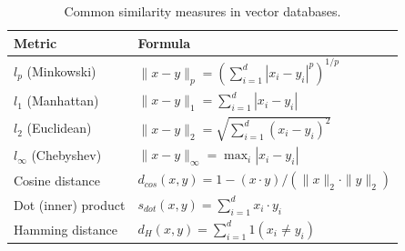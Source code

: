\begin{table}[h]
    \centering
    \renewcommand{\arraystretch}{2.3}
    \caption{Common similarity measures in vector databases.}
    \label{tab:distance-metrics}
    \begin{tabular}{|m{5cm}|m{8cm}|}
        \hline
        \textbf{Metric} & \textbf{Formula} \\ \hline
        $l_p$ (Minkowski) 
            & $\|x-y\|_p = \left(\sum_{i=1}^d |x_i-y_i|^p\right)^{1/p}$ \\ \hline
        $l_1$ (Manhattan) 
            & $\|x-y\|_1 = \sum_{i=1}^d |x_i-y_i|$ \\ \hline
        $l_2$ (Euclidean) 
            & $\|x-y\|_2 = \sqrt{\sum_{i=1}^d (x_i-y_i)^2}$ \\ \hline
        $l_\infty$ (Chebyshev) 
            & $\|x-y\|_\infty = \max_i |x_i-y_i|$ \\ \hline
        Cosine distance 
            & $d_{cos}(x,y) = 1 - (x \cdot y) / (\|x\|_2 \cdot \|y\|_2)
$ \\ \hline
        Dot (inner) product 
            & $s_{dot}(x,y) = \sum_{i=1}^d x_i \cdot y_i$ \\ \hline
        Hamming distance 
            & $d_{H}(x,y) = \sum_{i=1}^d 1(x_i \neq y_i)$ \\ \hline
    \end{tabular}
\end{table}